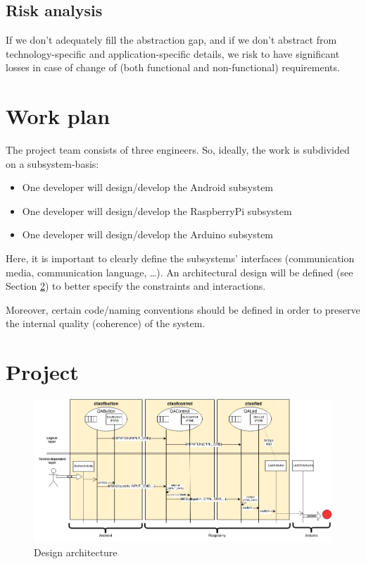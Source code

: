 \documentclass{article}
\newcommand{\labelsec}[1]{\label{sec:#1}}
\begin{document}
\subsection{Risk analysis}

  If we don't adequately fill the abstraction gap, and if we don't abstract
  from technology-specific and application-specific details, we risk to have
  significant losses in case of change of (both functional and non-functional) requirements.
  

\section{Work plan}
\labelsec{wplan}

The project team consists of three engineers. So, ideally, the work is
subdivided on a subsystem-basis:

\begin{itemize}
  \item One developer will design/develop the Android subsystem
  \item One developer will design/develop the RaspberryPi subsystem
  \item One developer will design/develop the Arduino subsystem
\end{itemize}

Here, it is important to clearly define the subsystems' interfaces
(communication media, communication language, \ldots). An architectural design
will be defined (see Section \ref{sec:Project}) to better specify the
constraints and interactions.

Moreover, certain code/naming conventions should be defined in order to preserve
the internal quality (coherence) of the system.

\section{Project}
\labelsec{Project}

\begin{figure}[H]
    \centering
     \includegraphics[scale=0.60, trim=4cm 0 0
     -1cm]{img/BLSDesignArch-ActorBased.png}
    \caption{Design architecture}
    \label{fig:designarch}
\end{figure}
\end{document}
